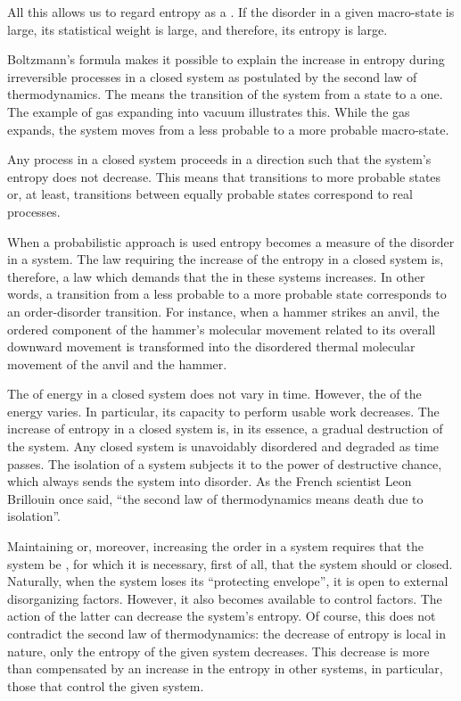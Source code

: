 All this allows us to regard entropy as a . If the disorder in a given macro-state is large, its statistical weight is large, and therefore, its entropy is large.



 Boltzmann's formula makes it possible to explain the increase in entropy during irreversible processes in a closed system as postulated by the second law of thermodynamics. The  means the transition of the system from a  state to a  one. The example of gas expanding into vacuum illustrates this. While the gas expands, the system moves from a less probable to a more probable macro-state.

Any process in a closed system proceeds in a direction such that the system's entropy does not decrease. This means that transitions to more probable states or, at least, transitions between equally probable states correspond to real processes.

When a probabilistic approach is used entropy becomes a measure of the disorder in a system. The law requiring the increase of the entropy in a closed system is, therefore, a law which demands that the  in these systems increases. In other words, a transition from a less probable to a more probable state corresponds to an order-disorder transition. For instance, when a hammer strikes an anvil, the ordered component of the hammer's molecular movement related to its overall downward movement is transformed into the disordered thermal molecular movement of the anvil and the hammer.

The  of energy in a closed system does not vary in time. However, the  of the energy varies. In particular, its capacity to perform usable work decreases. The increase of entropy in a closed system is, in its essence, a gradual destruction of the system. Any closed system is unavoidably disordered and degraded as time passes. The isolation of a system subjects it to the power of destructive chance, which always sends the system into disorder. As the French scientist Leon Brillouin once said, ``the second law of thermodynamics means death due to isolation''. 

Maintaining or, moreover, increasing the order in a system requires
that the system be , for which it is necessary, first of all, that the system should  or closed. Naturally, when the system loses its ``protecting envelope'', it is open to external disorganizing factors. However, it also becomes available to control factors. The action of the latter can decrease the system's entropy. Of course, this does not contradict the second law of thermodynamics: the decrease of entropy is local in nature, only the entropy of the given system decreases. This decrease is more than compensated by an increase in the entropy in other systems, in particular, those that control the given system.

